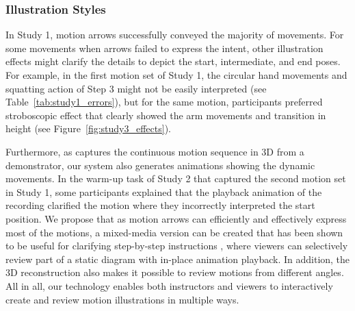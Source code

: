 \subsubsection{Illustration Styles}
In Study 1, motion arrows successfully conveyed the majority of movements. For some movements when arrows failed to express the intent, other illustration effects might clarify the details to depict the start, intermediate, and end poses. For example, in the first motion set of Study 1, the circular hand movements and squatting action of Step 3 might not be easily interpreted (see Table~\ref{tab:study1_errors}), but for the same motion, participants preferred stroboscopic effect that clearly showed the arm movements and transition in height (see Figure~\ref{fig:study3_effects}).

Furthermore, as \systemname{} captures the continuous motion sequence in 3D from a demonstrator, our system also generates animations showing the dynamic movements.
%
In the warm-up task of Study 2 that captured the second motion set in Study 1, some participants explained that the playback animation of the recording clarified the motion where they incorrectly interpreted the start position.
%
We propose that as motion arrows can efficiently and effectively express most of the motions, a mixed-media version can be created that has been shown to be useful for clarifying step-by-step instructions \cite{chi2012mixt}, where viewers can selectively review part of a static diagram with in-place animation playback. In addition, the 3D reconstruction also makes it possible to review motions from different angles.
%
All in all, our technology enables both instructors and viewers to interactively create and review motion illustrations in multiple ways.
